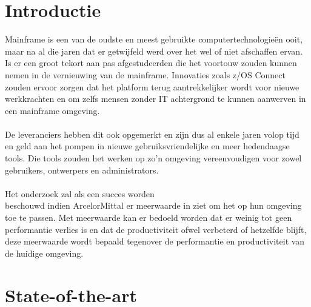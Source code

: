 
\section{Introductie}%
\label{sec:introductie}

Mainframe is een van de oudste en meest gebruikte computertechnologieën ooit, maar na al die jaren dat er getwijfeld werd over het wel of niet afschaffen ervan. Is er een groot tekort aan pas afgestudeerden die het voortouw zouden kunnen nemen in de vernieuwing van de mainframe. Innovaties zoals z/OS Connect zouden ervoor zorgen dat het platform terug aantrekkelijker wordt voor nieuwe werkkrachten en om zelfs mensen zonder IT achtergrond te kunnen aanwerven in een mainframe omgeving.
\\ \\
De leveranciers hebben dit ook opgemerkt en zijn dus al enkele jaren volop tijd en geld aan het pompen in nieuwe gebruiksvriendelijke en meer hedendaagse tools. Die tools zouden het werken op zo'n omgeving vereenvoudigen voor zowel gebruikers, ontwerpers en administrators.
\\ \\
Het onderzoek zal als een succes worden \\beschouwd indien ArcelorMittal er meerwaarde in ziet om het op hun omgeving toe te passen. Met meerwaarde kan er bedoeld worden dat er weinig tot geen performantie verlies is en dat de productiviteit ofwel verbeterd of hetzelfde blijft, deze meerwaarde wordt bepaald tegenover de performantie en productiviteit van de huidige omgeving.


\section{State-of-the-art}
\label{sec:state-of-the-art}


